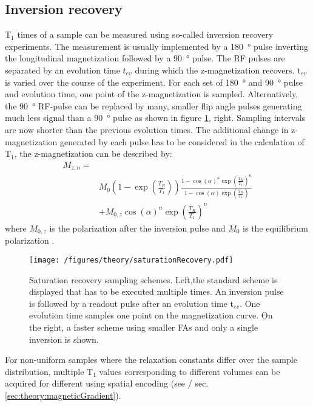         \subsection{Inversion recovery}
        T$_1$ times of a sample can be measured using so-called inversion recovery experiments. The measurement is usually implemented by a \SI{180}{\degree} pulse inverting the longitudinal magnetization followed by a \SI{90}{\degree} pulse. The RF pulses are separated by an evolution time $t_{ev}$ during which the z-magnetization recovers. t$_{ev}$ is varied over the course of the experiment. For each set of \SI{180}{\degree} and \SI{90}{\degree} pulse and evolution time, one point of the z-magnetization is sampled. Alternatively, the \SI{90}{\degree} RF-pulse can be replaced by many, smaller flip angle pulses generating much less signal than a \SI{90}{\degree} pulse as shown in figure \ref{figure:theory:inversionRecovery}, right. Sampling intervals are now shorter than the previous evolution times. The additional change in z-magnetization generated by each pulse has to be considered in the calculation of T$_1$, the z-magnetization can be described by:
        \begin{equation}
            \begin{split}
                M_{z,n} =& \\ &M_0 \left(1-\exp{\left(\frac{T_R}{T_1}\right)}\right)\frac{1-\cos(\alpha)^n\exp\left(\frac{T_R}{T_1}\right)^n}{1-\cos(\alpha)\exp\left(\frac{T_R}{T_1}\right)}\\ 
                         &+M_{0,z}\cos(\alpha)^n\exp\left(\frac{T_R}{T_1}\right)^n
            \end{split}
        \end{equation}
        where $M_{0,z}$ is the polarization after the inversion pulse and $M_0$ is the equilibrium polarization \cite{look_time_1970-1, drobnitzky_closed-form_2017}.
            \begin{figure}
                \centering
                \texttt{[image: /figures/theory/saturationRecovery.pdf]}
                \caption[Saturation recovery]{Saturation recovery sampling schemes. Left,the standard scheme is displayed that has to be executed multiple times. An inversion pulse is followed by a readout pulse after an evolution time t$_{ev}$. One evolution time samples one point on the magnetization curve. On the right, a faster scheme using smaller FAs and only a single inversion is shown.}
                \label{figure:theory:inversionRecovery}
            \end{figure}
            For non-uniform samples where the relaxation constants differ over the sample distribution, multiple T$_1$ values corresponding to different volumes can be acquired for different using spatial encoding (see \cite{scheffler_t1_2001} / sec. \ref{sec:theory:magneticGradient}).
